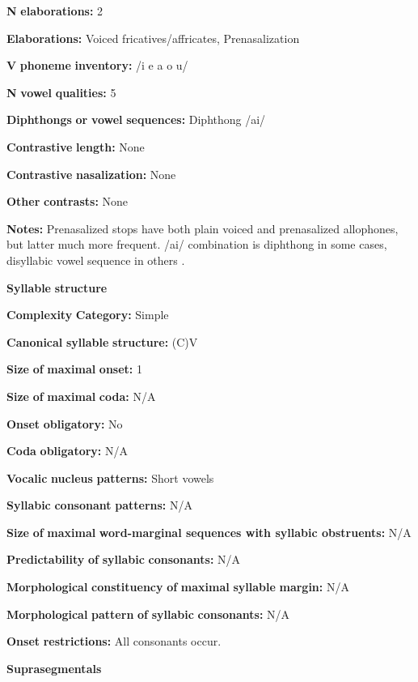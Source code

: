\begin{styleBody}
\textbf{N} \textbf{elaborations:} 2

\textbf{Elaborations:} Voiced fricatives/affricates, Prenasalization

\textbf{V} \textbf{phoneme} \textbf{inventory:} /i e a o u/

\textbf{N} \textbf{vowel} \textbf{qualities:} 5

\textbf{Diphthongs} \textbf{or} \textbf{vowel} \textbf{sequences:} Diphthong /ai/

\textbf{Contrastive} \textbf{length:} None

\textbf{Contrastive} \textbf{nasalization:} None

\textbf{Other} \textbf{contrasts:} None

\textbf{Notes:} Prenasalized stops have both plain voiced and prenasalized allophones, but latter much more frequent. /ai/ combination is diphthong in some cases, disyllabic vowel sequence in others \citep[22]{Wegener2008}.

\textbf{Syllable} \textbf{structure}

\textbf{Complexity} \textbf{Category:} Simple

\textbf{Canonical} \textbf{syllable} \textbf{structure:} (C)V \citep[23-4]{Wegener2008}

\textbf{Size} \textbf{of} \textbf{maximal} \textbf{onset:} 1

\textbf{Size} \textbf{of} \textbf{maximal} \textbf{coda:} N/A

\textbf{Onset} \textbf{obligatory:} No

\textbf{Coda} \textbf{obligatory:} N/A

\textbf{Vocalic} \textbf{nucleus} \textbf{patterns:} Short vowels

\textbf{Syllabic} \textbf{consonant} \textbf{patterns:} N/A

\textbf{Size} \textbf{of} \textbf{maximal} \textbf{word{}-marginal sequences with syllabic obstruents:} N/A

\textbf{Predictability} \textbf{of} \textbf{syllabic} \textbf{consonants:} N/A

\textbf{Morphological} \textbf{constituency} \textbf{of} \textbf{maximal} \textbf{syllable} \textbf{margin:} N/A

\textbf{Morphological} \textbf{pattern} \textbf{of} \textbf{syllabic} \textbf{consonants:} N/A

\textbf{Onset} \textbf{restrictions:} All consonants occur.

\textbf{Suprasegmentals}


\end{styleBody}
